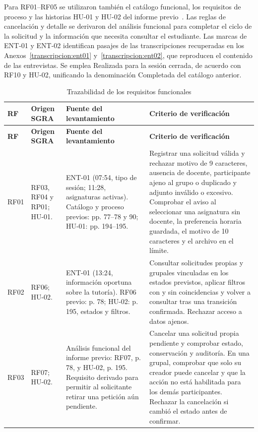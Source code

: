Para RF01--RF05 se utilizaron también el catálogo funcional,
los requisitos de proceso y las historias HU-01 y HU-02 del
informe previo~\cite{SGRA-documentacion-original}. Las reglas
de cancelación y detalle se derivaron del análisis funcional
para completar el ciclo de la solicitud y la información que
necesita consultar el estudiante.
Las marcas de ENT-01 y ENT-02 identifican pasajes de las
transcripciones recuperadas en los Anexos~\ref{transcripcion:ent01}
y~\ref{transcripcion:ent02}, que reproducen el contenido
de las entrevistas. Se emplea Realizada para la sesión cerrada,
de acuerdo con RF10 y HU-02, unificando la denominación
Completada del catálogo anterior.

\begin{longtable}{@{}p{}p{}p{}p{}@{}}
\caption{Trazabilidad de los requisitos funcionales}
\label{tab:trazabilidad-rf}\\

\toprule
\textbf{RF} &
\textbf{Origen SGRA} &
\textbf{Fuente del levantamiento} &
\textbf{Criterio de verificación}\\
\midrule
\endfirsthead

\toprule
\textbf{RF} &
\textbf{Origen SGRA} &
\textbf{Fuente del levantamiento} &
\textbf{Criterio de verificación}\\
\midrule
\endhead

RF01 &
RF03, RF04 y RP01; HU-01. &
ENT-01 (07:54, tipo de sesión; 11:28, asignaturas activas).
Catálogo y proceso previos: pp. 77--78 y 90;
HU-01: pp. 194--195. &
Registrar una solicitud válida y rechazar motivo de
9 caracteres, ausencia de docente, participante ajeno
al grupo o duplicado y adjunto inválido o excesivo.
Comprobar el aviso al seleccionar una asignatura sin docente,
la preferencia horaria guardada, el motivo de 10 caracteres
y el archivo en el límite. \\

RF02 &
RF06; HU-02. &
ENT-01 (13:24, información oportuna sobre la tutoría).
RF06 previo: p. 78; HU-02: p. 195, estados y filtros. &
Consultar solicitudes propias y grupales vinculadas
en los estados previstos,
aplicar filtros con y sin coincidencias y volver a consultar
tras una transición confirmada. Rechazar acceso a datos ajenos. \\

RF03 &
RF07; HU-02. &
Análisis funcional del informe previo: RF07, p. 78,
y HU-02, p. 195. Requisito derivado para permitir
al solicitante retirar una petición aún pendiente. &
Cancelar una solicitud propia pendiente y comprobar estado,
conservación y auditoría. En una grupal, comprobar que solo
su creador puede cancelar y que la acción no está habilitada
para los demás participantes. Rechazar la cancelación
si cambió el estado antes de confirmar. \\


\end{longtable}
